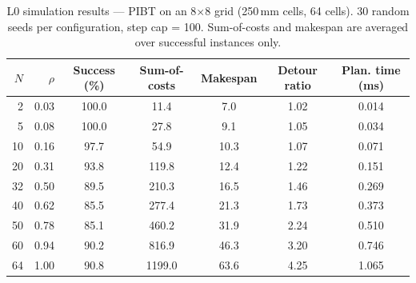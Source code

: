 \begin{table}[h]
\centering
\caption{L0 simulation results — PIBT on an 8$\times$8 grid (250\,mm cells, 64 cells).
         30 random seeds per configuration, step cap = 100.
         Sum-of-costs and makespan are averaged over successful instances only.}
\label{tab:l0_8x8}
\begin{tabular}{rr S[table-format=3.1] S[table-format=4.1] S[table-format=2.1] S[table-format=1.2] S[table-format=1.3]}
\toprule
$N$ & $\rho$ & {Success (\%)} & {Sum-of-costs} & {Makespan} & {Detour ratio} & {Plan. time (ms)} \\
 & 0.03 & 100.0 &   11.4 &  7.0 & 1.02 & 0.014 \\
 5 & 0.08 & 100.0 &   27.8 &  9.1 & 1.05 & 0.034 \\
10 & 0.16 &  97.7 &   54.9 & 10.3 & 1.07 & 0.071 \\
20 & 0.31 &  93.8 &  119.8 & 12.4 & 1.22 & 0.151 \\
32 & 0.50 &  89.5 &  210.3 & 16.5 & 1.46 & 0.269 \\
40 & 0.62 &  85.5 &  277.4 & 21.3 & 1.73 & 0.373 \\
50 & 0.78 &  85.1 &  460.2 & 31.9 & 2.24 & 0.510 \\
60 & 0.94 &  90.2 &  816.9 & 46.3 & 3.20 & 0.746 \\
64 & 1.00 &  90.8 & 1199.0 & 63.6 & 4.25 & 1.065 \\
\bottomrule
\end{tabular}
\end{table}
